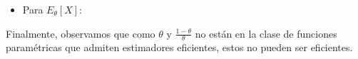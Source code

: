 \begin{ejercicio}
\begin{enumerate}[label=\alph*)]
\begin{itemize}
                \item Para $E_\theta[X]$:
            \end{itemize}
        Finalmente, observamos que como $\theta$ y $\frac{1-\theta}{\theta}$ no están en la clase de funciones paramétricas que admiten estimadores eficientes, estos no pueden ser eficientes.
    \end{enumerate}
\end{ejercicio}

